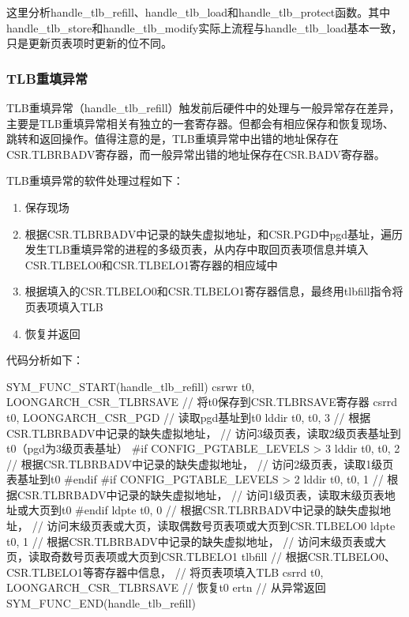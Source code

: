 这里分析handle\_tlb\_refill、handle\_tlb\_load和handle\_tlb\_protect函数。其中handle\_tlb\_store和handle\_tlb\_modify实际上流程与handle\_tlb\_load基本一致，只是更新页表项时更新的位不同。

\subsubsection{TLB重填异常}\label{sec:10-mmu-005}

TLB重填异常（handle\_tlb\_refill）触发前后硬件中的处理与一般异常存在差异，主要是TLB重填异常相关有独立的一套寄存器。但都会有相应保存和恢复现场、跳转和返回操作。值得注意的是，TLB重填异常中出错的地址保存在CSR.TLBRBADV寄存器，而一般异常出错的地址保存在CSR.BADV寄存器。

TLB重填异常的软件处理过程如下：

\begin{enumerate}
\def\labelenumi{\arabic{enumi}.}
\tightlist
\item
  保存现场
\item
  根据CSR.TLBRBADV中记录的缺失虚拟地址，和CSR.PGD中pgd基址，遍历发生TLB重填异常的进程的多级页表，从内存中取回页表项信息并填入CSR.TLBELO0和CSR.TLBELO1寄存器的相应域中
\item
  根据填入的CSR.TLBELO0和CSR.TLBELO1寄存器信息，最终用tlbfill指令将页表项填入TLB
\item
  恢复并返回
\end{enumerate}

代码分析如下：

\begin{CodeBlock}[language=BookLoongArch]
SYM_FUNC_START(handle_tlb_refill)
    csrwr   t0, LOONGARCH_CSR_TLBRSAVE // 将t0保存到CSR.TLBRSAVE寄存器
    csrrd   t0, LOONGARCH_CSR_PGD // 读取pgd基址到t0
    lddir   t0, t0, 3 // 根据CSR.TLBRBADV中记录的缺失虚拟地址，
                      // 访问3级页表，读取2级页表基址到t0（pgd为3级页表基址）
#if CONFIG_PGTABLE_LEVELS > 3
    lddir   t0, t0, 2 // 根据CSR.TLBRBADV中记录的缺失虚拟地址，
                      // 访问2级页表，读取1级页表基址到t0
#endif
#if CONFIG_PGTABLE_LEVELS > 2
    lddir   t0, t0, 1 // 根据CSR.TLBRBADV中记录的缺失虚拟地址，
                      // 访问1级页表，读取末级页表地址或大页到t0
#endif
    ldpte   t0, 0 // 根据CSR.TLBRBADV中记录的缺失虚拟地址，
                  // 访问末级页表或大页，读取偶数号页表项或大页到CSR.TLBELO0
    ldpte   t0, 1 // 根据CSR.TLBRBADV中记录的缺失虚拟地址，
                  // 访问末级页表或大页，读取奇数号页表项或大页到CSR.TLBELO1
    tlbfill // 根据CSR.TLBELO0、CSR.TLBELO1等寄存器中信息，
            // 将页表项填入TLB
    csrrd   t0, LOONGARCH_CSR_TLBRSAVE // 恢复t0
    ertn // 从异常返回
SYM_FUNC_END(handle_tlb_refill)
\end{CodeBlock}


